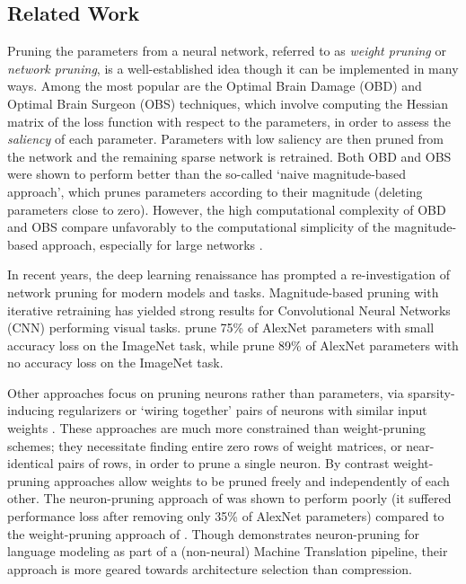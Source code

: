 \subsection{Related Work}
\label{subsec:related}
Pruning the parameters from a neural network, referred to as \textit{weight pruning} or \textit{network pruning}, is a well-established idea though it can be implemented in many ways. 
Among the most popular are the Optimal Brain Damage (OBD)
\cite{lecun1989optimal} and Optimal Brain Surgeon (OBS) \cite{hassibi1993second} techniques, which involve computing the Hessian matrix of the loss function with respect to the parameters, in order to assess the \textit{saliency} of each parameter. 
Parameters with low saliency are then pruned from the network and the remaining sparse network is retrained. 
Both OBD and OBS were shown to perform better than the so-called `naive magnitude-based approach', which prunes parameters according to their magnitude (deleting parameters close to zero).
However, the high computational complexity of OBD and OBS compare unfavorably to the computational simplicity of the magnitude-based approach, especially for large networks \cite{augasta2013pruning}.

In recent years, the deep learning renaissance has prompted a re-investigation of network pruning for modern models and tasks. 
Magnitude-based pruning with iterative retraining has yielded strong results for Convolutional Neural Networks (CNN) performing visual tasks.
\cite{collins2014memory} prune 75\% of AlexNet parameters with small accuracy loss on the ImageNet task, while \cite{han2015learning} prune 89\% of AlexNet parameters with no accuracy loss on the ImageNet task.

Other approaches focus on pruning neurons rather than parameters, via sparsity-inducing regularizers \cite{murray2015auto} or `wiring together' pairs of neurons with similar input weights \cite{srinivas2015data}. These approaches are much more constrained than weight-pruning schemes; they necessitate finding entire zero rows of weight matrices, or near-identical pairs of rows, in order to prune a single neuron. By contrast weight-pruning approaches allow weights to be pruned freely and independently of each other. The neuron-pruning approach of \cite{srinivas2015data} was shown to perform poorly (it suffered performance loss after removing only 35\% of AlexNet parameters) compared to the weight-pruning approach of \cite{han2015learning}. 
Though \cite{murray2015auto} demonstrates neuron-pruning for language modeling as part of a (non-neural) Machine Translation pipeline, their approach is more geared towards architecture selection than compression.

